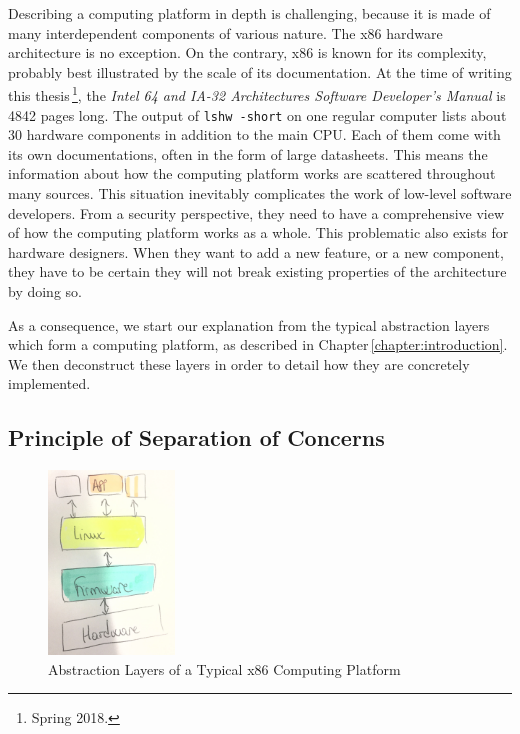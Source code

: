 
Describing a computing platform in depth is challenging, because it is made of
many interdependent components of various nature.
%
The x86 hardware architecture is no exception.
%
On the contrary, x86 is known for its complexity, probably best illustrated by
the scale of its documentation.
%
At the time of writing this thesis\,\footnote{Spring 2018.}, the \emph{Intel
64 and IA-32 Architectures Software Developer’s Manual} is 4842 pages long.
%
The output of \texttt{lshw -short} on one regular computer lists about 30
hardware components in addition to the main CPU.
%
Each of them come with its own documentations, often in the form of large
datasheets.
%
This means the information about how the computing platform works are
scattered throughout many sources.
%
This situation inevitably complicates the work of low-level software
developers.
%
From a security perspective, they need to have a comprehensive view of how the
computing platform works as a whole.
%
This problematic also exists for hardware designers.
%
When they want to add a new feature, or a new component, they have to be
certain they will not break existing properties of the architecture by doing
so.

%
As a consequence, we start our explanation from the typical abstraction layers
which form a computing platform, as described in
Chapter\,\ref{chapter:introduction}.
%
We then deconstruct these layers in order to detail how they are concretely
implemented.

\subsection{Principle of Separation of Concerns}

\begin{figure}
  \centering
  \includegraphics[width=0.3\textwidth]{Figures/computing-platform-1.jpg}
  \caption{Abstraction Layers of a Typical x86 Computing Platform}
  \label{fig:usecase:computing-platform-1}
\end{figure}

